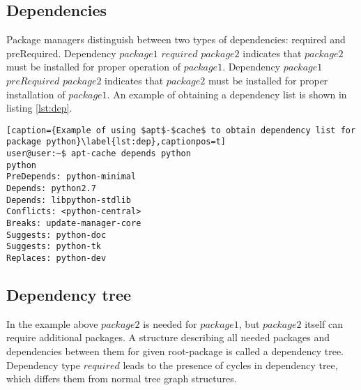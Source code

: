 \subsection*{Dependencies} \label{subs:dep}
Package managers distinguish between two types of dependencies: required and preRequired.
Dependency $package1$ $required$ $package2$ indicates that $package2$ must be installed for proper operation of $package1$.
Dependency $package1$ $preRequired$ $package2$ indicates that $package2$ must be installed for proper installation of $package1$.
An example of obtaining a dependency list is shown in listing \ref{lst:dep}.\\
\begin{lstlisting}[caption={Example of using $apt$-$cache$ to obtain dependency list for package python}\label{lst:dep},captionpos=t] 
user@user:~$ apt-cache depends python
python
PreDepends: python-minimal
Depends: python2.7
Depends: libpython-stdlib
Conflicts: <python-central>
Breaks: update-manager-core
Suggests: python-doc
Suggests: python-tk
Replaces: python-dev
\end{lstlisting}
\subsection*{Dependency tree}
In the example above $package2$ is needed for $package1$, but $package2$ itself can require additional packages.
A structure describing all needed packages and dependencies between them for given root-package is called a dependency tree. 
Dependency type $required$ leads to the presence of cycles in dependency tree, which differs them from normal tree graph structures.


